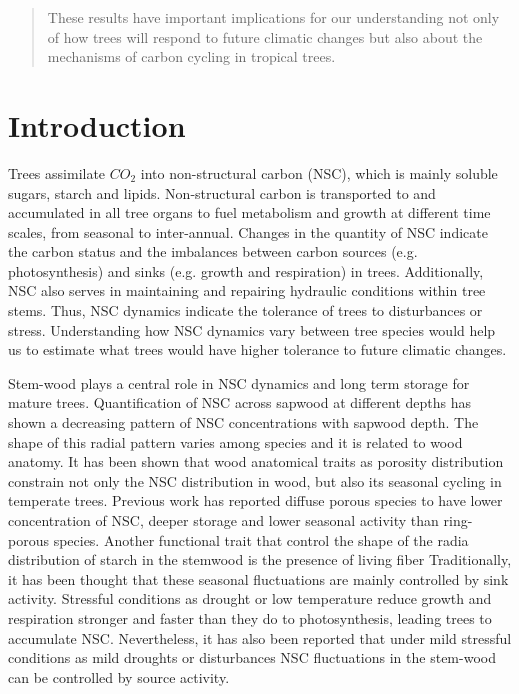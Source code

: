 \documentclass{article}
\begin{document}
\begin{abstract}
These results have important implications for our understanding not only of how trees will respond to future climatic changes but also about the mechanisms of carbon cycling in tropical trees.


\end{abstract}

\section{Introduction}

Trees assimilate $CO_{2}$ into non-structural carbon (NSC), which is mainly soluble sugars, starch and lipids. 
Non-structural carbon is transported to and accumulated in all tree organs to fuel metabolism and growth at different time scales, from seasonal to inter-annual. 
Changes in the quantity of NSC indicate the carbon status and the imbalances between carbon sources (e.g. photosynthesis) and sinks (e.g. growth and respiration) in trees. Additionally, 
NSC also serves in maintaining and repairing hydraulic conditions within tree stems. Thus, NSC dynamics indicate the tolerance of trees to disturbances or stress. 
Understanding how NSC dynamics vary between tree species would help us to estimate what trees would have higher tolerance to future climatic changes. 

Stem-wood plays a central role in NSC dynamics and long term storage for mature trees. 
Quantification of NSC across sapwood at different depths has shown a decreasing pattern of NSC concentrations with sapwood depth. 
The shape of this radial pattern varies among species and it is related to wood anatomy. 
It has been shown that wood anatomical traits as porosity distribution constrain not only the NSC distribution in wood, but also its seasonal cycling in temperate trees.
 Previous work has reported diffuse porous species to have lower concentration of NSC, deeper storage and lower seasonal activity than ring-porous species. 
 Another functional trait that control the shape of the radia distribution of starch in the stemwood is the presence of living fiber
 Traditionally, it has been thought that these seasonal fluctuations are mainly controlled by sink activity. 
 Stressful conditions as drought or low temperature reduce growth and respiration stronger and faster than they do to photosynthesis, leading trees to accumulate NSC. 
 Nevertheless, it has also been reported that under mild stressful conditions as mild droughts or disturbances NSC fluctuations in the stem-wood can be controlled by source activity.
 
\end{document}

